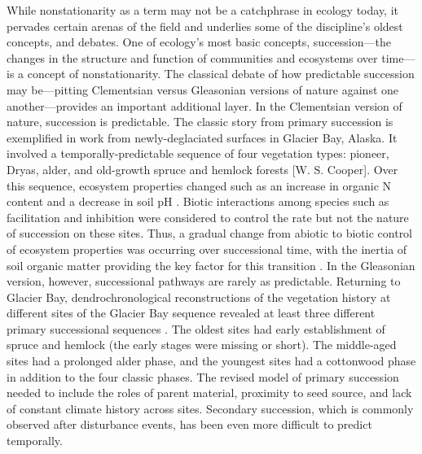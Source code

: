 \documentclass[11pt,a4paper,oneside]{article}
\begin{document}
While nonstationarity as a term may not be a catchphrase in ecology today, it pervades certain arenas of the field and underlies some of the discipline's oldest concepts, and debates. One of ecology's most basic concepts, succession---the changes in the structure and function of communities and ecosystems over time---is a concept of nonstationarity. The classical debate of how predictable succession may be---pitting Clementsian versus Gleasonian versions of nature against one another---provides an important additional layer. In the Clementsian version of nature, succession is predictable. The classic story from primary succession is exemplified in work from newly-deglaciated surfaces in Glacier Bay, Alaska. It involved a temporally-predictable sequence of four vegetation types: pioneer, Dryas, alder, and old-growth spruce and hemlock forests [W. S. Cooper]. Over this sequence, ecosystem properties changed such as an increase in organic N content and a decrease in soil pH \citep{Chapin1994}. Biotic interactions among species such as facilitation and inhibition were considered to control the rate but not the nature of succession on these sites. Thus, a gradual change from abiotic to biotic control of ecosystem properties was occurring over successional time, with the inertia of soil organic matter providing the key factor for this transition \citep{Milner2007}. In the Gleasonian version, however, successional pathways are rarely as predictable. Returning to Glacier Bay, dendrochronological reconstructions of the vegetation history at different sites of the Glacier Bay sequence revealed at least three different primary successional sequences \citep{Fastie1995}. The oldest sites had early establishment of spruce and hemlock (the early stages were missing or short). The middle-aged sites had a prolonged alder phase, and the youngest sites had a cottonwood phase in addition to the four classic phases. The revised model of primary succession needed to include the roles of parent material, proximity to seed source, and lack of constant climate history across sites. Secondary succession, which is commonly observed after disturbance events, has been even more difficult to predict temporally. \\
\end{document}
